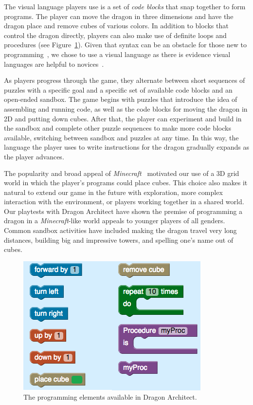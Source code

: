 \documentclass{sig-alternate}
\newcommand{\gametitle}{{Dragon Architect}}
\begin{document}
The visual language players use is a set of \emph{code blocks} that snap together to form programs. 
The player can move the dragon in three dimensions and have the dragon place and remove cubes of various colors. 
In addition to blocks that control the dragon directly, players can also make use of definite loops and procedures (see Figure~\ref{fig:toolbox}).
Given that syntax can be an obstacle for those new to programming~\cite{stefik2013syntax}, we chose to use a visual language as there is evidence visual languages are helpful to novices~\cite{whitley1997visual}.

As players progress through the game, they alternate between short sequences of puzzles with a specific goal and a specific set of available code blocks and an open-ended sandbox. 
The game begins with puzzles that introduce the idea of assembling and running code, as well as the code blocks for moving the dragon in 2D and putting down cubes.
After that, the player can experiment and build in the sandbox and complete other puzzle sequences to make more code blocks available, switching between sandbox and puzzles at any time. 
In this way, the language the player uses to write instructions for the dragon gradually expands as the player advances.

The popularity and broad appeal of \emph{Minecraft}~\cite{minecraft} motivated our use of a 3D grid world in which the player's programs could place cubes.
This choice also makes it natural to extend our game in the future with exploration, more complex interaction with the environment, or players working together in a shared world.
Our playtests with \gametitle{} have shown the premise of programming a dragon in a \emph{Minecraft}-like world appeals to younger players of all genders.
Common sandbox activities have included making the dragon travel very long distances, building big and impressive towers, and spelling one's name out of cubes.

\begin{figure}[htb]
  \centering
  \includegraphics[width=\columnwidth]{images/toolbox-wide}
  \caption{The programming elements available in \gametitle{}.}
  \label{fig:toolbox}
\end{figure}
\end{document}
